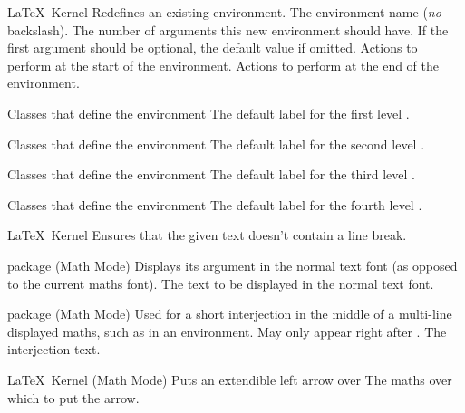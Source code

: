 %
 {}%
 {\LaTeX\ Kernel}%
 {Redefines an existing environment.}%
 {%
   \BeginArgList
     The environment name (\emph{no} backslash).
     The number of arguments this new
     environment should have.
     If the first argument should be optional,
     the default value if omitted.
     Actions to perform at the start of the
      environment.
     Actions to perform at the end of the
      environment.
   \EndArgList
 }

%
 {}%
 {Classes that define the  environment}%
 {The default label for the first level .}%
 {}

%
 {}%
 {Classes that define the  environment}%
 {The default label for the second level .}%
 {}

%
 {}%
 {Classes that define the  environment}%
 {The default label for the third level .}%
 {}

%
 {}%
 {Classes that define the  environment}%
 {The default label for the fourth level .}%
 {}

%
 {}%
 {\LaTeX\ Kernel}%
 {Ensures that the given text doesn't contain a line break.}%
 {}

%
 {}%
 { package (Math Mode)}%
 {Displays its argument in the normal text font (as opposed to the
  current maths font).}%
 {%
   \BeginArgList
      The text to be displayed in the normal text font.
   \EndArgList
 }

%
 {}%
 { package (Math Mode)}%
 {Used for a short interjection in the middle of a multi-line
  displayed maths, such as in an  environment.
  May only appear right after .}%
 {%
   \BeginArgList
      The interjection text.
   \EndArgList
 }

%
 {}%
 {\LaTeX\ Kernel (Math Mode)}%
 {Puts an extendible left arrow over }%
 {%
   \BeginArgList
      The maths over which to put the arrow.
   \EndArgList
 }

